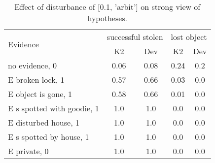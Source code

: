 \begin{table}\begin{tabular}{l|cc|cc}\toprule\multirow{2}{*}{Evidence} & \multicolumn{2}{c}{successful stolen}& \multicolumn{2}{c}{lost object}\\& {K2} & {Dev}& {K2} & {Dev}\\\midrule
no evidence, 0 & 0.06&0.08&0.24&0.2\\E broken lock, 1 & \cellcolor{Bittersweet}0.57&\cellcolor{Bittersweet}0.66&0.03&0.0\\E object is gone, 1 & \cellcolor{Bittersweet}0.58&\cellcolor{Bittersweet}0.66&0.01&0.0\\E s spotted with goodie, 1 & 1.0&1.0&0.0&0.0\\E disturbed house, 1 & 1.0&1.0&0.0&0.0\\E s spotted by house, 1 & 1.0&1.0&0.0&0.0\\E private, 0 & 1.0&1.0&0.0&0.0\\\bottomrule\end{tabular}\caption{Effect of disturbance of [0.1, 'arbit'] on strong view of hypotheses.}\end{table}